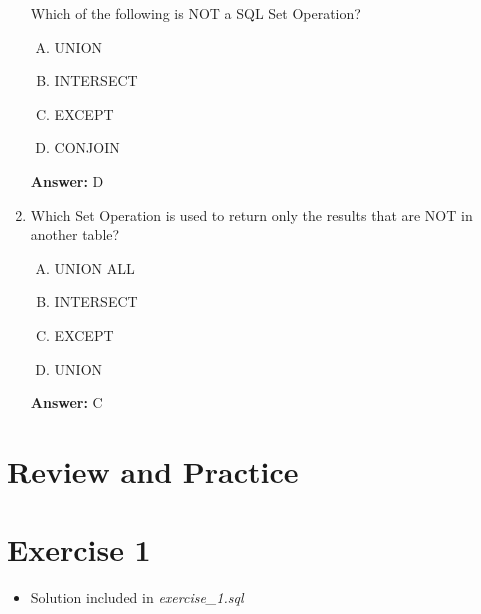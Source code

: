 \documentclass[12pt]{article}
\begin{document}
\begin{enumerate}[1.]
    Which of the following is NOT a SQL Set Operation?

    \begin{enumerate}[A.]
        \item UNION
        \item INTERSECT
        \item EXCEPT
        \item CONJOIN
    \end{enumerate}

    \bigskip

    \textbf{Answer:} D

    \item

    Which Set Operation is used to return only the results that are NOT in another
    table?

    \begin{enumerate}[A.]
        \item UNION ALL
        \item INTERSECT
        \item EXCEPT
        \item UNION
    \end{enumerate}

    \bigskip

    \textbf{Answer:} C
\end{enumerate}

\bigskip

\section{Review and Practice}

\bigskip

\section{Exercise 1}

\bigskip

\begin{itemize}
    \item Solution included in \textit{exercise\_1.sql}
\end{itemize}
\end{document}
